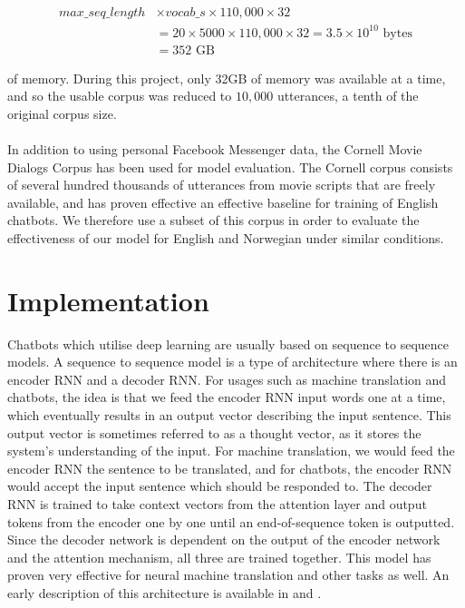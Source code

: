 \documentclass{article}
\begin{document}
\begin{align*}
  max\_seq\_length &\times vocab\_s \times 110,000 \times 32 \\
  &= 20 \times 5000 \times 110,000 \times 32 = 3.5 \times 10^{10} \text{ bytes}\\
  &= 352 \text{ GB}
\end{align*}

of memory. During this project, only 32GB of memory was available at a
time, and so the usable corpus was reduced to $10, 000$ utterances, a tenth
of the original corpus size.

\paragraph{}
In addition to using personal Facebook Messenger data, the Cornell Movie
Dialogs Corpus \cite{cornell-corpus} has been used for model evaluation.
The Cornell corpus consists of several hundred thousands of utterances
from movie scripts that are freely available, and has proven effective
an effective baseline for training of English chatbots. We therefore use
a subset of this corpus in order to evaluate the effectiveness of our model
for English and Norwegian under similar conditions.

\section*{Implementation}
Chatbots which utilise deep learning are usually based on sequence to sequence
models. A sequence to sequence model is a type of architecture where there is
an encoder RNN and a decoder RNN. For usages such as machine translation and
chatbots, the idea is that we feed the encoder RNN input words one at a time,
which eventually results in an output vector describing the input sentence.
This output vector is sometimes referred to as a thought vector, as it stores
the system's understanding of the input. For machine translation, we would feed
the encoder RNN the sentence to be translated, and for chatbots, the encoder
RNN would accept the input sentence which should be responded to. The decoder
RNN is trained to take context vectors from the attention layer and output
tokens from the encoder one by one until an end-of-sequence token is outputted.
Since the decoder network is dependent on the output of the encoder network and
the attention mechanism, all three are trained together. This model has proven
very effective for neural machine translation and other tasks as well. An early
description of this architecture is available in \cite{Cho2014} and
\cite{Bahdanau2015}.
\end{document}
